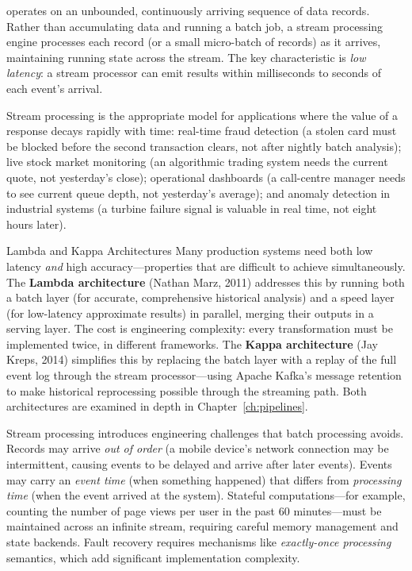  operates on an unbounded, continuously arriving
sequence of data records. Rather than accumulating data and running a
batch job, a stream processing engine processes each record (or a
small micro-batch of records) as it arrives, maintaining running
state across the stream. The key characteristic is \emph{low latency}:
a stream processor can emit results within milliseconds to seconds of
each event's arrival.

Stream processing is the appropriate model for applications where the
value of a response decays rapidly with time: real-time fraud detection
(a stolen card must be blocked before the second transaction clears, not
after nightly batch analysis); live stock market monitoring (an
algorithmic trading system needs the current quote, not yesterday's
close); operational dashboards (a call-centre manager needs to see
current queue depth, not yesterday's average); and anomaly detection in
industrial systems (a turbine failure signal is valuable in real time,
not eight hours later).

\begin{keyinsight}{Lambda and Kappa Architectures}
Many production systems need both low latency \emph{and} high
accuracy---properties that are difficult to achieve simultaneously. The
\textbf{Lambda architecture} (Nathan Marz, 2011) addresses this by
running both a batch layer (for accurate, comprehensive historical
analysis) and a speed layer (for low-latency approximate results) in
parallel, merging their outputs in a serving layer. The cost is
engineering complexity: every transformation must be implemented twice,
in different frameworks. The \textbf{Kappa architecture} (Jay Kreps,
2014) simplifies this by replacing the batch layer with a replay of the
full event log through the stream processor---using Apache Kafka's
message retention to make historical reprocessing possible through the
streaming path. Both architectures are examined in depth in
Chapter~\ref{ch:pipelines}.
\end{keyinsight}

Stream processing introduces engineering challenges that batch processing
avoids. Records may arrive \emph{out of order} (a mobile device's
network connection may be intermittent, causing events to be delayed and
arrive after later events). Events may carry an \emph{event time}
(when something happened) that differs from \emph{processing time}
(when the event arrived at the system). Stateful computations---for
example, counting the number of page views per user in the past
60 minutes---must be maintained across an infinite stream, requiring
careful memory management and state backends. Fault recovery requires
mechanisms like \emph{exactly-once processing} semantics, which add
significant implementation complexity.

